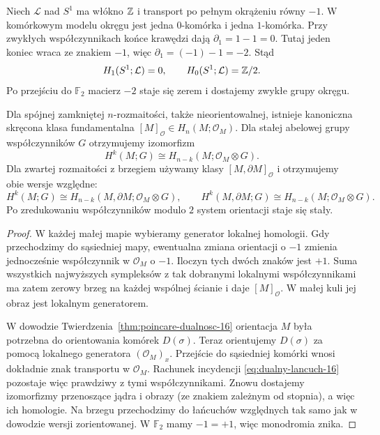 \begin{przyklad}
Niech $\mathcal L$ nad $S^1$
ma włókno $\mathbb{Z}$ i transport
po pełnym okrążeniu
równy $-1$. W komórkowym
modelu okręgu jest
jedna $0$-komórka
i jedna $1$-komórka.
Przy zwykłych
współczynnikach końce
krawędzi dają
$\partial_1=1-1=0$.
Tutaj jeden koniec
wraca ze znakiem
$-1$, więc
$\partial_1=(-1)-1=-2$.
Stąd
\[
 H_1(S^1;\mathcal L)=0,\qquad
 H_0(S^1;\mathcal L)=\mathbb{Z}/2.
\]
Po przejściu do
$\mathbb F_2$ macierz
$-2$ staje się zerem
i dostajemy zwykłe
grupy okręgu.
\end{przyklad}

\begin{twierdzenie}
\label{thm:pd-skrecenie-16}
Dla spójnej zamkniętej
$n$-rozmaitości, także
nieorientowalnej, istnieje
kanoniczna skręcona klasa
fundamentalna
$[M]_{\mathcal O}\in
H_n(M;\mathcal O_M)$.
Dla stałej abelowej grupy
współczynników $G$
otrzymujemy izomorfizm
\[
 H^k(M;G)\cong
 H_{n-k}(M;\mathcal O_M\otimes G).
\]
Dla zwartej rozmaitości z brzegiem używamy
klasy $[M,\partial M]_{\mathcal O}$ i otrzymujemy
obie wersje względne:
\[
 H^k(M;G)\cong H_{n-k}(M,\partial M;\mathcal O_M\otimes G),
 \qquad
 H^k(M,\partial M;G)\cong H_{n-k}(M;\mathcal O_M\otimes G).
\]
Po zredukowaniu
współczynników modulo $2$
system orientacji staje
się stały.
\end{twierdzenie}
\begin{proof}
W każdej małej mapie
wybieramy generator
lokalnej homologii.
Gdy przechodzimy
do sąsiedniej mapy,
ewentualna zmiana
orientacji o $-1$
zmienia jednocześnie
współczynnik w
$\mathcal O_M$ o $-1$.
Iloczyn tych dwóch
znaków jest $+1$.
Suma wszystkich
najwyższych sympleksów
z tak dobranymi
lokalnymi współczynnikami
ma zatem zerowy brzeg
na każdej wspólnej
ścianie i daje
$[M]_{\mathcal O}$.
W małej kuli jej obraz
jest lokalnym generatorem.

W dowodzie
Twierdzenia~\ref{thm:poincare-dualnosc-16}
orientacja $M$ była
potrzebna do orientowania
komórek $D(\sigma)$.
Teraz orientujemy
$D(\sigma)$ za pomocą
lokalnego generatora
$(\mathcal O_M)_x$.
Przejście do sąsiedniej
komórki wnosi dokładnie
znak transportu
w $\mathcal O_M$.
Rachunek incydencji
\eqref{eq:dualny-lancuch-16}
pozostaje więc prawdziwy
z tymi współczynnikami.
Znowu dostajemy
izomorfizmy przenoszące jądra i obrazy
(ze znakiem zależnym od stopnia), a więc ich homologie.
Na brzegu przechodzimy
do łańcuchów względnych
tak samo jak w dowodzie
wersji zorientowanej.
W $\mathbb F_2$
mamy $-1=+1$,
więc monodromia znika.
\end{proof}

